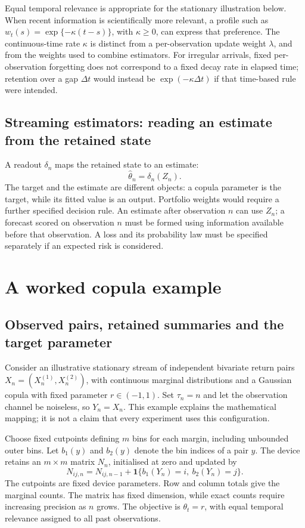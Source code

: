 Equal temporal relevance is appropriate for the stationary illustration below. When recent information is scientifically more relevant, a profile such as $w_t(s)=\exp\{-\kappa(t-s)\}$, with $\kappa\geq0$, can express that preference. The continuous-time rate $\kappa$ is distinct from a per-observation update weight $\lambda$, and from the weights used to combine estimators. For irregular arrivals, fixed per-observation forgetting does not correspond to a fixed decay rate in elapsed time; retention over a gap $\Delta t$ would instead be $\exp(-\kappa\Delta t)$ if that time-based rule were intended.

\subsection{Streaming estimators: reading an estimate from the retained state}
A readout $\delta_n$ maps the retained state to an estimate:
\[
 \widehat\theta_n=\delta_n(Z_n).
\]
The target and the estimate are different objects: a copula parameter is the target, while its fitted value is an output. Portfolio weights would require a further specified decision rule. An estimate after observation $n$ can use $Z_n$; a forecast scored on observation $n$ must be formed using information available before that observation. A loss and its probability law must be specified separately if an expected risk is considered.

\section{A worked copula example}
\label{sec:copula-example}
\subsection{Observed pairs, retained summaries and the target parameter}
Consider an illustrative stationary stream of independent bivariate return pairs $X_n=(X_n^{(1)},X_n^{(2)})$, with continuous marginal distributions and a Gaussian copula with fixed parameter $r\in(-1,1)$. Set $\tau_n=n$ and let the observation channel be noiseless, so $Y_n=X_n$. This example explains the mathematical mapping; it is not a claim that every experiment uses this configuration.

Choose fixed cutpoints defining $m$ bins for each margin, including unbounded outer bins. Let $b_1(y)$ and $b_2(y)$ denote the bin indices of a pair $y$. The device retains an $m\times m$ matrix $N_n$, initialised at zero and updated by
\[
 N_{ij,n}=N_{ij,n-1}+\mathbf 1\{b_1(Y_n)=i,\ b_2(Y_n)=j\}.
\]
The cutpoints are fixed device parameters. Row and column totals give the marginal counts. The matrix has fixed dimension, while exact counts require increasing precision as $n$ grows. The objective is $\theta_t=r$, with equal temporal relevance assigned to all past observations.

